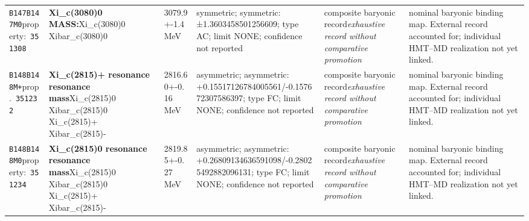\begin{landscape}
\begin{longtable}{L{1.85cm}L{4.45cm}L{2.35cm}L{4.05cm}L{3.35cm}L{7.15cm}}
\texttt{B147}\newline \texttt{B147M0}\newline property:\ \texttt{351308} & \textbf{Xi\_\allowbreak{}c(3080)0 MASS:}\newline Xi\_\allowbreak{}c(3080)0 \textbar{}\allowbreak{} Xibar\_\allowbreak{}c(3080)0 & 3079.9+-1.4\,MeV & symmetric; symmetric: ±1.3603458501256609; type AC; limit NONE; confidence not reported & composite baryonic record\newline \emph{exhaustive record without comparative promotion} & nominal baryonic binding map. External record accounted for; individual HMT--MD realization not yet linked. \\
\texttt{B148}\newline \texttt{B148M+}\newline prop.\ \texttt{351232} & \textbf{Xi\_\allowbreak{}c(2815)+ resonance resonance mass}\newline Xi\_\allowbreak{}c(2815)0 \textbar{}\allowbreak{} Xibar\_\allowbreak{}c(2815)0 \textbar{}\allowbreak{} Xi\_\allowbreak{}c(2815)+ \textbar{}\allowbreak{} Xibar\_\allowbreak{}c(2815)- & 2816.60+-0.16\,MeV & asymmetric; asymmetric: +0.15517126784005561/-0.157672307586397; type FC; limit NONE; confidence not reported & composite baryonic record\newline \emph{exhaustive record without comparative promotion} & nominal baryonic binding map. External record accounted for; individual HMT--MD realization not yet linked. \\
\texttt{B148}\newline \texttt{B148M0}\newline property:\ \texttt{351234} & \textbf{Xi\_\allowbreak{}c(2815)0 resonance resonance mass}\newline Xi\_\allowbreak{}c(2815)0 \textbar{}\allowbreak{} Xibar\_\allowbreak{}c(2815)0 \textbar{}\allowbreak{} Xi\_\allowbreak{}c(2815)+ \textbar{}\allowbreak{} Xibar\_\allowbreak{}c(2815)- & 2819.85+-0.27\,MeV & asymmetric; asymmetric: +0.26809134636591098/-0.28025492882096131; type FC; limit NONE; confidence not reported & composite baryonic record\newline \emph{exhaustive record without comparative promotion} & nominal baryonic binding map. External record accounted for; individual HMT--MD realization not yet linked. \\

\end{longtable}
\end{landscape}
